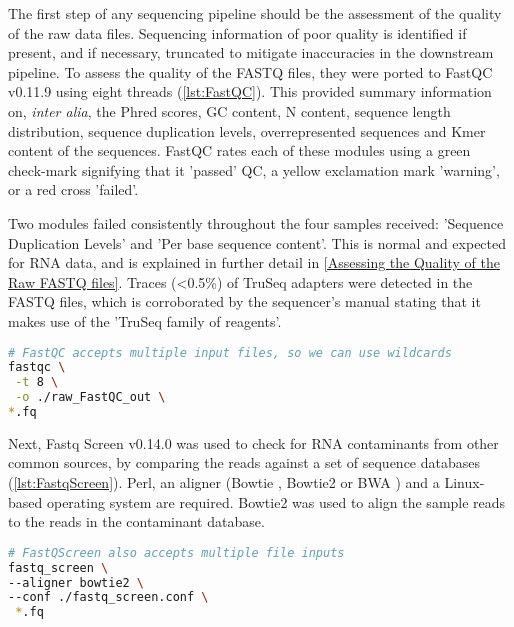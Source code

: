 The first step of any sequencing pipeline should be the assessment of the quality of the raw data files. Sequencing information of poor quality is identified if present, and if necessary, truncated to mitigate inaccuracies in the downstream pipeline. To assess the quality of the FASTQ files, they were ported to FastQC v0.11.9 \citep{andrews2019} using eight threads (\autoref{lst:FastQC}). This provided summary information on, \textit{inter alia}, the Phred scores, GC content, N content, sequence length distribution, sequence duplication levels, overrepresented sequences and Kmer content of the sequences. FastQC rates each of these modules using a green check-mark signifying that it 'passed' QC, a yellow exclamation mark 'warning', or a red cross 'failed'. 

Two modules failed consistently throughout the four samples received: 'Sequence Duplication Levels' and 'Per base sequence content'. This is normal and expected for RNA data, and is explained in further detail in \autoref{Assessing the Quality of the Raw FASTQ files}. Traces (<0.5\%) of TruSeq adapters were detected in the FASTQ files, which is corroborated by the sequencer's manual \citep{HiSeq2000} stating that it makes use of the 'TruSeq family of reagents'. 


\begin{lstlisting}[language=bash, caption=FastQC command, label={lst:FastQC}]
# FastQC accepts multiple input files, so we can use wildcards
fastqc \
 -t 8 \
 -o ./raw_FastQC_out \
*.fq 
\end{lstlisting}

Next, Fastq Screen v0.14.0 \citep{wingett2018fastq} was used to check for RNA contaminants from other common sources, by comparing the reads against a set of sequence databases (\autoref{lst:FastqScreen}). Perl, an aligner (Bowtie \citep{bowtie}, Bowtie2 \citep{bowtie2} or BWA \citep{bwa}) and a Linux-based operating system are required. Bowtie2 was used to align the sample reads to the reads in the contaminant database.

\begin{lstlisting}[language=bash, caption=FastqScreen command, label={lst:FastqScreen}]
# FastQScreen also accepts multiple file inputs
fastq_screen \
--aligner bowtie2 \
--conf ./fastq_screen.conf \
 *.fq 
\end{lstlisting}


